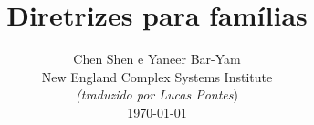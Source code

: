 \documentclass[onecolumn,journal]{IEEEtran}
\begin{document}
\title{\color{Brown} Diretrizes para famílias \\
\vspace{-0.35ex}}
\author{Chen Shen e Yaneer Bar-Yam \\ New England Complex Systems Institute \\
\vspace{+0.35ex}
\small{\textit{(traduzido por Lucas Pontes})}\\
 \today
  \vspace{-14ex} \\


\bigskip
\bigskip

\textbf{}
 }

\maketitle


\flushbottom %



\thispagestyle{empty} %




\renewcommand{\thefootnote}{\fnsymbol{footnote}}
\end{document}
